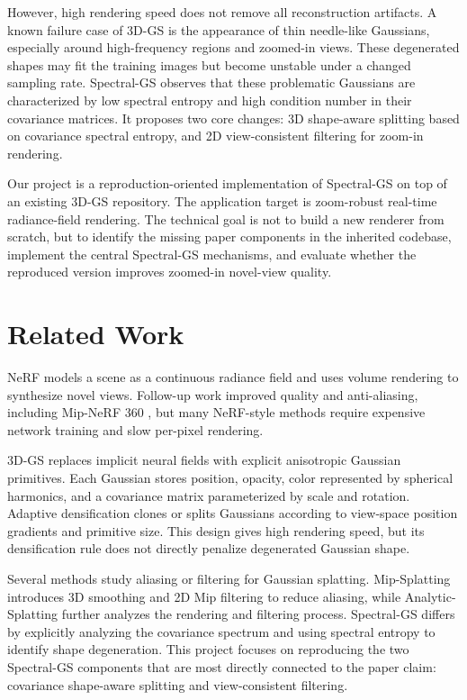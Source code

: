 \documentclass{article}
\begin{document}
However, high rendering speed does not remove all reconstruction artifacts. A known failure case of 3D-GS is the appearance of thin needle-like Gaussians, especially around high-frequency regions and zoomed-in views. These degenerated shapes may fit the training images but become unstable under a changed sampling rate. Spectral-GS \cite{huang2024spectralgs} observes that these problematic Gaussians are characterized by low spectral entropy and high condition number in their covariance matrices. It proposes two core changes: 3D shape-aware splitting based on covariance spectral entropy, and 2D view-consistent filtering for zoom-in rendering.

Our project is a reproduction-oriented implementation of Spectral-GS on top of an existing 3D-GS repository. The application target is zoom-robust real-time radiance-field rendering. The technical goal is not to build a new renderer from scratch, but to identify the missing paper components in the inherited codebase, implement the central Spectral-GS mechanisms, and evaluate whether the reproduced version improves zoomed-in novel-view quality.

\section{Related Work}
\label{sec:related}

NeRF \cite{mildenhall2020nerf} models a scene as a continuous radiance field and uses volume rendering to synthesize novel views. Follow-up work improved quality and anti-aliasing, including Mip-NeRF 360 \cite{barron2022mipnerf360}, but many NeRF-style methods require expensive network training and slow per-pixel rendering.

3D-GS \cite{kerbl20233dgs} replaces implicit neural fields with explicit anisotropic Gaussian primitives. Each Gaussian stores position, opacity, color represented by spherical harmonics, and a covariance matrix parameterized by scale and rotation. Adaptive densification clones or splits Gaussians according to view-space position gradients and primitive size. This design gives high rendering speed, but its densification rule does not directly penalize degenerated Gaussian shape.

Several methods study aliasing or filtering for Gaussian splatting. Mip-Splatting \cite{yu2024mipsplatting} introduces 3D smoothing and 2D Mip filtering to reduce aliasing, while Analytic-Splatting \cite{liang2024analyticsplatting} further analyzes the rendering and filtering process. Spectral-GS \cite{huang2024spectralgs} differs by explicitly analyzing the covariance spectrum and using spectral entropy to identify shape degeneration. This project focuses on reproducing the two Spectral-GS components that are most directly connected to the paper claim: covariance shape-aware splitting and view-consistent filtering.
\end{document}

